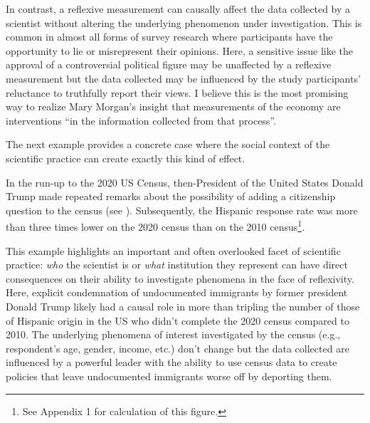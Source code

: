 In contrast, a reflexive measurement can causally affect the data collected by a scientist without altering the underlying phenomenon under investigation. This is common in almost all forms of survey research where participants have the opportunity to lie or misrepresent their opinions. Here, a sensitive issue like the approval of a controversial political figure may be unaffected by a reflexive measurement but the data collected may be influenced by the study participants' reluctance to truthfully report their views. I believe this is the most promising way to realize Mary Morgan's insight that measurements of the economy are interventions ``in the information collected from that process''. 

The next example provides a concrete case where the social context of the scientific practice can create exactly this kind of effect.

\begin{example}[2020 US Census]\label{ex_census}
    In the run-up to the 2020 US Census, then-President of the United States Donald Trump made repeated remarks about the possibility of adding a citizenship question to the census (see \cite{blake2022}). Subsequently, the Hispanic response rate was more than three times lower on the 2020 census than on the 2010 census\footnote{See Appendix 1 for calculation of this figure.}.
\end{example}


\noindent This example highlights an important and often overlooked facet of scientific practice: \textit{who} the scientist is or \textit{what} institution they represent can have direct consequences on their ability to investigate phenomena in the face of reflexivity. Here, explicit condemnation of undocumented immigrants by former president Donald Trump likely had a causal role in more than tripling the number of those of Hispanic origin in the US who didn't complete the 2020 census compared to 2010. The underlying phenomena of interest investigated by the census (e.g., respondent's age, gender, income, etc.) don't change but the data collected are influenced by a powerful leader with the ability to use census data to create policies that leave undocumented immigrants worse off by deporting them.


